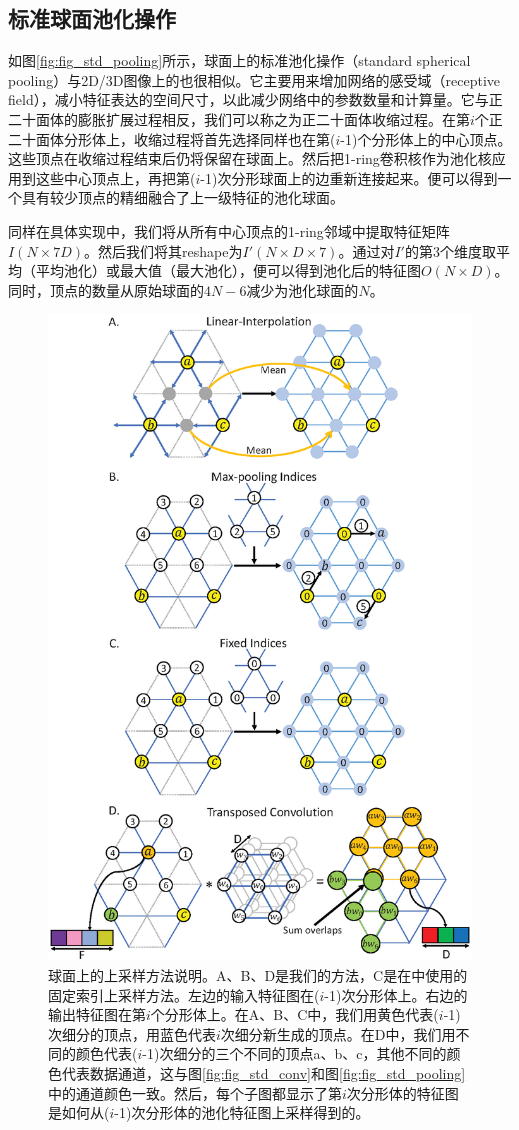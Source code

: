 \subsection{标准球面池化操作}
如图\ref{fig:fig_std_pooling}所示，球面上的标准池化操作（standard spherical pooling）与2D/3D图像上的也很相似。它主要用来增加网络的感受域（receptive field），减小特征表达的空间尺寸，以此减少网络中的参数数量和计算量。它与正二十面体的膨胀扩展过程相反，我们可以称之为正二十面体收缩过程。在第$i$个正二十面体分形体上，收缩过程将首先选择同样也在第($i$-1)个分形体上的中心顶点。这些顶点在收缩过程结束后仍将保留在球面上。然后把1-ring卷积核作为池化核应用到这些中心顶点上，再把第($i$-1)次分形球面上的边重新连接起来。便可以得到一个具有较少顶点的精细融合了上一级特征的池化球面。

同样在具体实现中，我们将从所有中心顶点的1-ring邻域中提取特征矩阵$I(N\times 7D)$。然后我们将其reshape为$I'(N\times D\times7)$。通过对$I'$的第3个维度取平均（平均池化）或最大值（最大池化），便可以得到池化后的特征图$O(N\times D)$。同时，顶点的数量从原始球面的$4N-6$减少为池化球面的$N$。


\begin{figure}[t]
	\centering
	\includegraphics[width=0.52\linewidth]{figure/figure_upsampling_layer.eps}
	\caption{球面上的上采样方法说明。A、B、D是我们的方法，C是在\cite{jiang2018spherical,parvathaneni2019cortical}中使用的固定索引上采样方法。左边的输入特征图在($i$-1)次分形体上。右边的输出特征图在第$i$个分形体上。在A、B、C中，我们用黄色代表($i$-1)次细分的顶点，用蓝色代表$i$次细分新生成的顶点。在D中，我们用不同的颜色代表($i$-1)次细分的三个不同的顶点a、b、c，其他不同的颜色代表数据通道，这与图\ref{fig:fig_std_conv}和图\ref{fig:fig_std_pooling}中的通道颜色一致。然后，每个子图都显示了第$i$次分形体的特征图是如何从($i$-1)次分形体的池化特征图上采样得到的。}
	\label{fig:fig_upsampling}
\end{figure}

